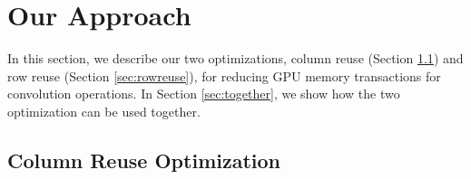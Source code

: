 \section{Our Approach}
\label{sec:strategies} In this section, we describe our two optimizations, column reuse (Section \ref{sec:creuse}) and row reuse (Section
\ref{sec:rowreuse}), for reducing GPU memory transactions for convolution operations. In Section \ref{sec:together}, we show how the two
optimization can be used together.

%

\subsection{Column Reuse Optimization}
\label{sec:creuse}

